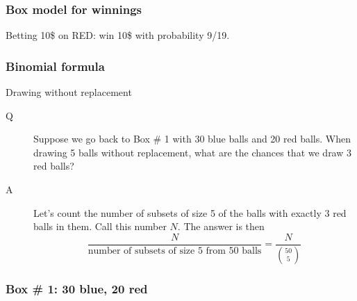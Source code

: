 \documentclass[handout]{beamer}
\begin{document}
   \begin{frame}
   \frametitle{Box model for winnings}
   \begin{center}
   \end{center}
   Betting 10\$ on {\color{red} RED}: win 10\$ with probability 9/19.
   \end{frame}


   \begin{frame} \frametitle{Binomial formula}

   \begin{block}
   {Drawing without replacement}

   \begin{description}
   \item[Q]  Suppose we go back to Box \# 1 with 30 blue balls and
   20 red balls. When drawing 5 balls without replacement,
   what are the chances that we draw 3 red balls?


   \item[A] Let's count the number of subsets of size 5 of the balls
   with exactly 3 red balls in them. Call this number $N$. The answer is then
   $$
   \frac{N}{\text{number of subsets of size 5 from 50 balls}} = \frac{N}{\binom{50}{5}}
   $$
   \end{description}
   \end{block}
   \end{frame}



   \begin{frame}
   \frametitle{Box \# 1: 30 blue, 20 red}
   \begin{center}
   \end{center}

   \end{frame}
\end{document}
